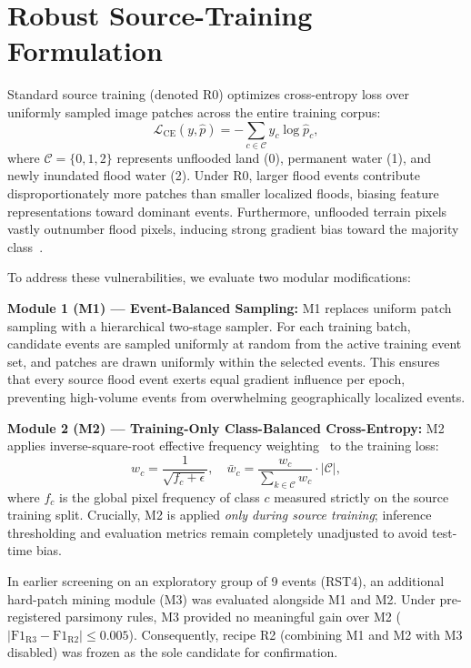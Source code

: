 \documentclass[conference]{IEEEtran}
\begin{document}
\section{Robust Source-Training Formulation}
Standard source training (denoted R0) optimizes cross-entropy loss over uniformly sampled image patches across the entire training corpus:
\begin{equation}
\mathcal{L}_{\text{CE}}(y, \hat{p}) = - \sum_{c \in \mathcal{C}} y_c \log \hat{p}_c,
\end{equation}
where $\mathcal{C} = \{0, 1, 2\}$ represents unflooded land (0), permanent water (1), and newly inundated flood water (2). Under R0, larger flood events contribute disproportionately more patches than smaller localized floods, biasing feature representations toward dominant events. Furthermore, unflooded terrain pixels vastly outnumber flood pixels, inducing strong gradient bias toward the majority class~\cite{cui2019class,buda2018systematic}.

To address these vulnerabilities, we evaluate two modular modifications:

\textbf{Module 1 (M1) — Event-Balanced Sampling:} M1 replaces uniform patch sampling with a hierarchical two-stage sampler. For each training batch, candidate events are sampled uniformly at random from the active training event set, and patches are drawn uniformly within the selected events. This ensures that every source flood event exerts equal gradient influence per epoch, preventing high-volume events from overwhelming geographically localized events.

\textbf{Module 2 (M2) — Training-Only Class-Balanced Cross-Entropy:} M2 applies inverse-square-root effective frequency weighting~\cite{cui2019class,lin2017focal} to the training loss:
\begin{equation}
w_c = \frac{1}{\sqrt{f_c + \epsilon}}, \quad \bar{w}_c = \frac{w_c}{\sum_{k \in \mathcal{C}} w_c} \cdot |\mathcal{C}|,
\end{equation}
where $f_c$ is the global pixel frequency of class $c$ measured strictly on the source training split. Crucially, M2 is applied \textit{only during source training}; inference thresholding and evaluation metrics remain completely unadjusted to avoid test-time bias.

In earlier screening on an exploratory group of 9 events (RST4), an additional hard-patch mining module (M3) was evaluated alongside M1 and M2. Under pre-registered parsimony rules, M3 provided no meaningful gain over M2 ($|\text{F1}_{\text{R3}} - \text{F1}_{\text{R2}}| \le 0.005$). Consequently, recipe R2 (combining M1 and M2 with M3 disabled) was frozen as the sole candidate for confirmation.
\end{document}
